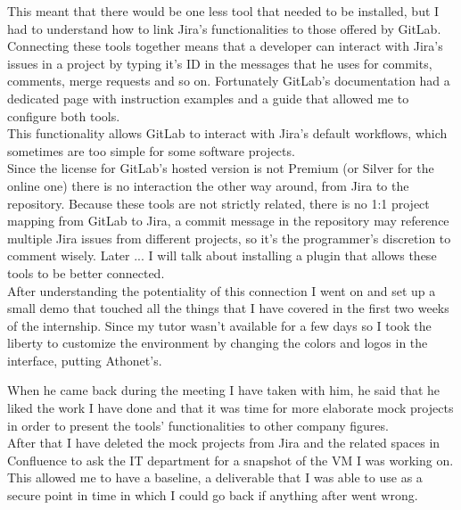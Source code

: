 	
	This meant that there would be one less tool that needed to be installed, but I had to understand how to link Jira's functionalities to those offered by GitLab.\\
	Connecting these tools together means that a developer can interact with Jira's issues in a project by typing it's ID in the messages that he uses for commits, comments, merge requests and so on.
	Fortunately GitLab's documentation had a dedicated page with instruction examples and a guide that allowed me to configure both tools.\\
	This functionality allows GitLab to interact with Jira's default workflows, which sometimes are too simple for some software projects.\\
	Since the license for GitLab's hosted version is not Premium (or Silver for the online one) there is no interaction the other way around, from Jira to the repository.
	Because these tools are not strictly related, there is no 1:1 project mapping from GitLab to Jira, a commit message in the repository may reference multiple Jira issues from different projects, so it's the programmer's discretion to comment wisely.
	Later ... I will talk about installing a plugin that allows these tools to be better connected.\\
	After understanding the potentiality of this connection I went on and set up a small demo that touched all the things that I have covered in the first two weeks of the internship.
	Since my tutor wasn't available for a few days so I took the liberty to customize the environment by changing the colors and logos in the interface, putting Athonet's.
	
	
	When he came back during the meeting I have taken with him, he said that he liked the work I have done and that it was time for more elaborate mock projects in order to present the tools' functionalities to other company figures.\\
	After that I have deleted the mock projects from Jira and the related spaces in Confluence to ask the IT department for a snapshot of the VM I was working on.\\	
	This allowed me to have a baseline, a deliverable that I was able to use as a secure point in time in which I could go back if anything after went wrong.
	
